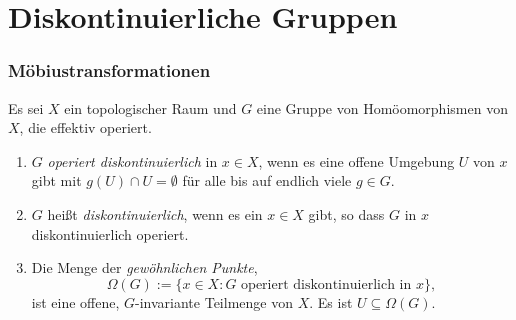 \part{Diskontinuierliche Gruppen}


\section{Möbiustransformationen}\label{sec_moebius}

\DB Es sei $X$ ein topologischer Raum und $G$ eine Gruppe von
Homöomorphismen von $X$, die effektiv operiert.
\begin{enumerate}
\item $G$ \emph{operiert diskontinuierlich}
in $x\in X$, wenn es
eine offene Umgebung $U$ von $x$ gibt mit $g(U)\cap U=\emptyset$
für alle bis auf endlich viele $g\in G$.
\item $G$ heißt \emph{diskontinuierlich},
wenn es ein $x\in X$ gibt, so dass $G$ in $x$ diskontinuierlich
operiert.
\item Die Menge der \emph{gewöhnlichen Punkte},
\[
\Omega(G) := \{x\in X : G \text{ operiert diskontinuierlich in } x \},
\]
ist eine offene, $G$-invariante Teilmenge von $X$.
Es ist $U\subseteq \Omega(G)$.
\end{enumerate}

